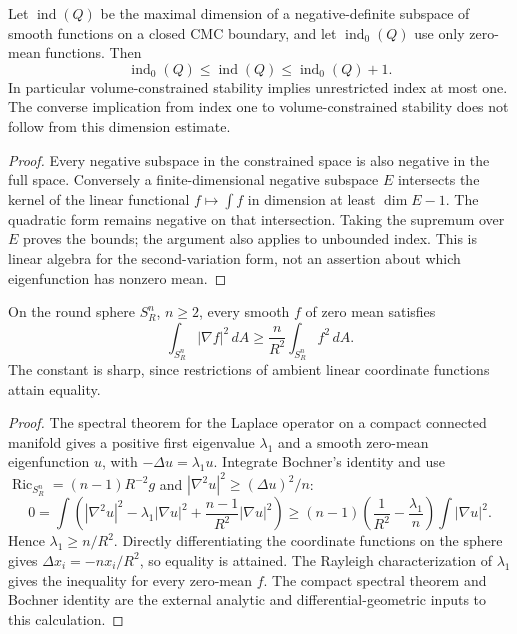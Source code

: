 \begin{proposition}\label{prop:cmc-constrained-index}
Let $\operatorname{ind}(Q)$ be the maximal dimension of a negative-definite subspace of smooth functions on a closed CMC boundary, and let $\operatorname{ind}_0(Q)$ use only zero-mean functions. Then
\[
 \operatorname{ind}_0(Q)\leq\operatorname{ind}(Q)
 \leq\operatorname{ind}_0(Q)+1.
\]
In particular volume-constrained stability implies unrestricted index at most one. The converse implication from index one to volume-constrained stability does not follow from this dimension estimate.
\end{proposition}
\begin{proof}
Every negative subspace in the constrained space is also negative in the full space. Conversely a finite-dimensional negative subspace $E$ intersects the kernel of the linear functional $f\mapsto\int f$ in dimension at least $\dim E-1$. The quadratic form remains negative on that intersection. Taking the supremum over $E$ proves the bounds; the argument also applies to unbounded index. This is linear algebra for the second-variation form, not an assertion about which eigenfunction has nonzero mean.
\end{proof}

\begin{proposition}\label{prop:round-sphere-poincare}
On the round sphere $S_R^n$, $n\geq2$, every smooth $f$ of zero mean satisfies
\[
 \int_{S_R^n}|\nabla f|^2\,dA\geq\frac n{R^2}\int_{S_R^n}f^2\,dA.
\]
The constant is sharp, since restrictions of ambient linear coordinate functions attain equality.
\end{proposition}
\begin{proof}
The spectral theorem for the Laplace operator on a compact connected manifold gives a positive first eigenvalue $\lambda_1$ and a smooth zero-mean eigenfunction $u$, with $-\Delta u=\lambda_1u$. Integrate Bochner's identity and use $\operatorname{Ric}_{S_R^n}=(n-1)R^{-2}g$ and $|\nabla^2u|^2\geq(\Delta u)^2/n$:
\[
 0=\int\left(|\nabla^2u|^2-\lambda_1|\nabla u|^2
 +\frac{n-1}{R^2}|\nabla u|^2\right)
 \geq(n-1)\left(\frac1{R^2}-\frac{\lambda_1}{n}\right)
 \int|\nabla u|^2.
\]
Hence $\lambda_1\geq n/R^2$. Directly differentiating the coordinate functions on the sphere gives $\Delta x_i=-nx_i/R^2$, so equality is attained. The Rayleigh characterization of $\lambda_1$ gives the inequality for every zero-mean $f$. The compact spectral theorem and Bochner identity are the external analytic and differential-geometric inputs to this calculation.
\end{proof}

